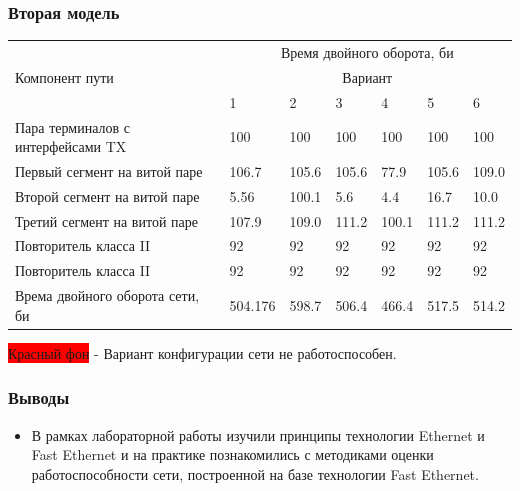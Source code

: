 \begin{frame}
\frametitle{Вторая модель}
\begin{tabular}{|m{2.5cm}|l|l|l|l|l|l|}
    \hline
    \multirow{3}{*}{Компонент пути} & \multicolumn{6}{|c|}{Время двойного оборота, би} \\ \cline{2-7}
                                    & \multicolumn{6}{|c|}{Вариант} \\ \cline{2-7}
                                    & 1 & 2 & 3 & 4 & 5 & 6 \\ \hline
        Пара терминалов с интерфейсами TX & 100 & 100 & 100 & 100 & 100 & 100 \\ \hline
        Первый сегмент на витой паре & 106.7 & 105.6 & 105.6 & 77.9 & 105.6 & 109.0 \\ \hline
        Второй сегмент на витой паре & 5.56 & 100.1 & 5.6 & 4.4 & 16.7 & 10.0 \\ \hline
        Третий сегмент на витой паре & 107.9 & 109.0 & 111.2 & 100.1 & 111.2 & 111.2 \\ \hline
        Повторитель класса II & 92 & 92 & 92 & 92 & 92 & 92 \\ \hline
        Повторитель класса II & 92 & 92 & 92 & 92 & 92 & 92 \\ \hline
        Врема двойного оборота сети, би & 504.176 & \cellcolor{red} 598.7 & 506.4 & 466.4 &\cellcolor{red} 517.5 &\cellcolor{red} 514.2 \\ \hline
    \end{tabular}
\colorbox{red}{Красный фон} - Вариант конфигурации сети не работоспособен.
\end{frame}
\begin{frame}
\frametitle{Выводы}
\begin{itemize}
    \item В рамках лабораторной работы изучили принципы технологии Ethernet и Fast Ethernet
и на практике познакомились с методиками оценки работоспособности сети, построенной
на базе технологии Fast Ethernet.
\end{itemize}
\end{frame}


